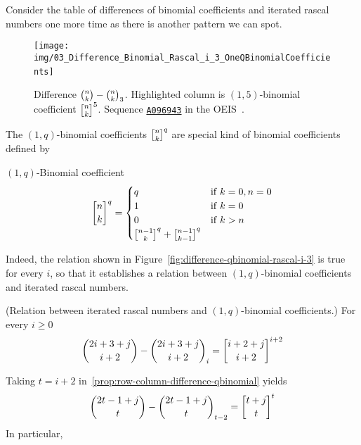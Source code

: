 ﻿Consider the table of differences of binomial coefficients and iterated rascal numbers one more time
as there is another pattern we can spot.
\begin{figure}[H]
    \centering
    \texttt{[image: img/03\_Difference\_Binomial\_Rascal\_i\_3\_OneQBinomialCoefficients]}
    ~\caption{Difference $\binom{n}{k}-\binom{n}{k}_{3}$.
    Highlighted column is $(1,5)$-binomial coefficient $\oneQBinomial{n}{k}{5}$.
    Sequence \href{https://oeis.org/A096943}{\texttt{A096943}} in the OEIS~\cite{sloane2004sixth}.}
    \label{fig:difference-qbinomial-rascal-i-3}
\end{figure}
The $(1,q)$-binomial coefficients $\oneQBinomial{n}{k}{q}$ are special kind of binomial coefficients defined by
\begin{definition}
    $(1,q)$-Binomial coefficient
    \begin{equation}
        \oneQBinomial{n}{k}{q} =
        \begin{cases}
            q & \mathrm{if} \; k=0, n=0 \\
            1 & \mathrm{if} \; k=0 \\
            0 & \mathrm{if} \; k > n \\
            \oneQBinomial{n-1}{k}{q} + \oneQBinomial{n-1}{k-1}{q}
        \end{cases}\label{eq:qbinomial-definition}
    \end{equation}
\end{definition}
Indeed, the relation shown in Figure~\eqref{fig:difference-qbinomial-rascal-i-3} is true for every $i$,
so that it establishes a relation between $(1,q)$-binomial coefficients and iterated rascal numbers.
\begin{proposition} (Relation between iterated rascal numbers and $(1,q)$-binomial coefficients.)
    For every $i\geq0$
    \label{prop:row-column-difference-qbinomial}
    \begin{align*}
        \binom{2i+3+j}{i+2} - \rascalNumber{2i+3+j}{i+2}{i} = \oneQBinomial{i+2+j}{i+2}{i+2}
    \end{align*}
\end{proposition}
Taking $t=i+2$ in~\eqref{prop:row-column-difference-qbinomial} yields
\begin{align*}
    \binom{2t-1+j}{t} - \rascalNumber{2t-1+j}{t}{t-2} = \oneQBinomial{t+j}{t}{t}
\end{align*}
In particular,
